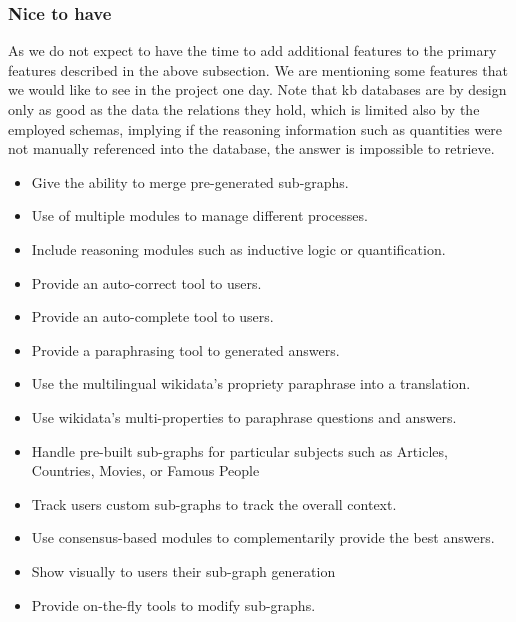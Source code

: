 \subsubsection{Nice to have}
As we do not expect to have the time to add additional features to the primary features described in the above subsection. We are mentioning some features that we would like to see in the project one day. Note that \gls{kb} databases are by design only as good as the data the relations they hold, which is limited also by the employed schemas, implying if the reasoning information such as quantities were not manually referenced into the database, the answer is impossible to retrieve.

\begin{itemize}
    \setlength\itemsep{0em}
    \item Give the ability to merge pre-generated sub-graphs.
    \item Use of multiple modules to manage different processes.
    \item Include reasoning modules such as inductive logic or quantification.
    \item Provide an auto-correct tool to users.
    \item Provide an auto-complete tool to users.
    \item Provide a paraphrasing tool to generated answers.
    \item Use the multilingual \gls{wikidata}'s propriety paraphrase into a translation.
    \item Use \gls{wikidata}'s multi-properties to paraphrase questions and answers.
    \item Handle pre-built sub-graphs for particular subjects such as Articles, Countries, Movies, or Famous People
    \item Track users custom sub-graphs to track the overall context.
    \item Use consensus-based modules to complementarily provide the best answers.
    \item Show visually to users their sub-graph generation
    \item Provide on-the-fly tools to modify sub-graphs.
\end{itemize}



